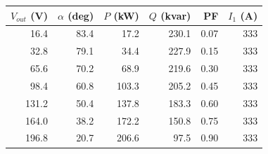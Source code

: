 \begin{tabular}{rrrrrr}
\toprule
$V_{out}$ (V) & $\alpha$ (deg) & $P$ (kW) & $Q$ (kvar) & PF & $I_1$ (A)\\
\midrule
16.4 & 83.4 & 17.2 & 230.1 & 0.07 & 333\\
32.8 & 79.1 & 34.4 & 227.9 & 0.15 & 333\\
65.6 & 70.2 & 68.9 & 219.6 & 0.30 & 333\\
98.4 & 60.8 & 103.3 & 205.2 & 0.45 & 333\\
131.2 & 50.4 & 137.8 & 183.3 & 0.60 & 333\\
164.0 & 38.2 & 172.2 & 150.8 & 0.75 & 333\\
196.8 & 20.7 & 206.6 & 97.5 & 0.90 & 333\\
\bottomrule
\end{tabular}

